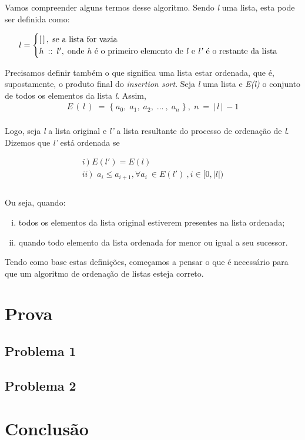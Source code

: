 \documentclass[a4paper, 10pt]{article}
\begin{document}
Vamos compreender alguns termos desse algoritmo. Sendo \textit{l} uma lista, esta pode ser definida como:

	\begin{equation*}
		l =
        \begin{cases}
        	[\,]\,,\; \text{se a lista for vazia}\\
            h\: :: \: l',\; \text{onde \textit{h} é o primeiro elemento de \textit{l} e \textit{l'} é o restante da lista} \\
        \end{cases}
	\end{equation*}

Precisamos definir também o que significa uma lista estar ordenada, que é, supostamente, o produto final do \textit{insertion sort}. Seja \textit{l}
uma lista e \textit{E(l)} o conjunto de todos os elementos da lista \textit{l}. Assim,
\begin{align*}
	E\,(\,l\,)\;=\; \{\;a_0,\;a_1,\;a_2,\;...\:,\;a_n\;\}\:,\;n\:=\:|\,l\,|\,-1
\end{align*}
\\
Logo, seja \textit{l} a lista original e \textit{l'} a lista resultante do processo de ordenação de \textit{l}. Dizemos que \textit{l'} está ordenada se

\begin{gather*}
   i\,)\;E(l')=E(l) \\
   ii\,)\;\; a_i \leq a_{i+1}, \forall a_i \: \in E(l') \: , i\in [0,|l|) \\ 
\end{gather*}  
\\
Ou seja, quando:
\begin{enumerate}[i)]
	\item todos os elementos da lista original estiverem presentes na lista ordenada;
    \item quando todo elemento da lista ordenada for menor ou igual a seu sucessor.
\end{enumerate}

Tendo como base estas definições, começamos a pensar o que é necessário para que um algoritmo de ordenação de listas esteja correto. 

\section{Prova}

\subsection{Problema 1}

\subsection{Problema 2}

\section{Conclusão}
\end{document}
